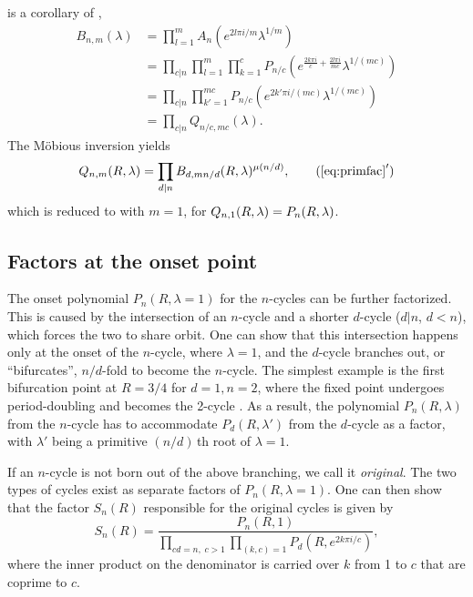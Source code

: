 \documentclass{ws-ijbc}
\begin{document}
 is a corollary of ,
\begin{align*}
 B_{n, m} (\lambda)
 & = \prod_{l = 1}^{m} A_n(e^{2l\pi i/m} \lambda^{1/m}) \\
 & = \prod_{c | n} \prod_{l=1}^m \prod_{k=1}^c
    P_{n/c}(e^{\frac{2k\pi i}{c} + \frac{2l\pi i}{m c}} \lambda^{1/(m c)}) \\
 & = \prod_{c | n} \prod_{k'=1}^{m c}
    P_{n/c}(e^{2k'\pi i/(m c)} \lambda^{1/(m c)}) \\
 & = \prod_{c | n} Q_{n /c, m c}(\lambda).
\end{align*}
The M\"obious inversion yields
\begin{equation}
  Q_{n, m}\Rlam
= \prod_{d|n} B_{d, m n/d}\Rlam^{\mu(n/d)},
\tag{$\ref{eq:primfac}'$}
\end{equation}
which is reduced to  with $m = 1$,
for $Q_{n, 1}(R, \lambda) = P_n(R, \lambda)$.









\subsection{\label{sec:origfac}%
  Factors at the onset point}


The onset polynomial
  $P_n(R, \lambda = 1)$ for the $n$-cycles
  can be further factorized.
%
This is caused by the intersection of an $n$-cycle
  and a shorter $d$-cycle ($d|n$, $d < n$),
  which forces the two to share orbit.
%
One can show that this intersection happens only
  at the onset of the $n$-cycle, where $\lambda = 1$,
%
  and the $d$-cycle branches out, or ``bifurcates'', $n/d$-fold
  to become the $n$-cycle.
%
The simplest example is the first bifurcation point
  at $R = 3/4$ for $d = 1, n = 2$,
  where the fixed point 
  undergoes period-doubling and becomes the 2-cycle .
As a result, the polynomial $P_n(R, \lambda)$ from the $n$-cycle
  has to accommodate $P_d(R, \lambda')$ from the $d$-cycle as a factor,
  with $\lambda'$ being a primitive $(n/d)\,$th root of $\lambda = 1$.



If an $n$-cycle is not born out of the above branching,
  we call it \emph{original}.
The two types of cycles exist
  as separate factors of $P_n(R, \lambda = 1)$.
One can then show that the factor $S_n(R)$ responsible for the original cycles
  is given by
  \begin{equation}
    S_n(R)
    = \frac
    {
      P_n(R, 1)
    }
    {
      \prod_{c d =  n, \; c > 1}
        \prod_{(k, c) = 1}
      P_{d}
        \left(
          R, e^{2k\pi i/c}
        \right)
    },
  \label{eq:origfac}
  \end{equation}
where the inner product on the denominator is carried over
   $k$ from 1 to $c$ that are coprime to $c$.
\end{document}
